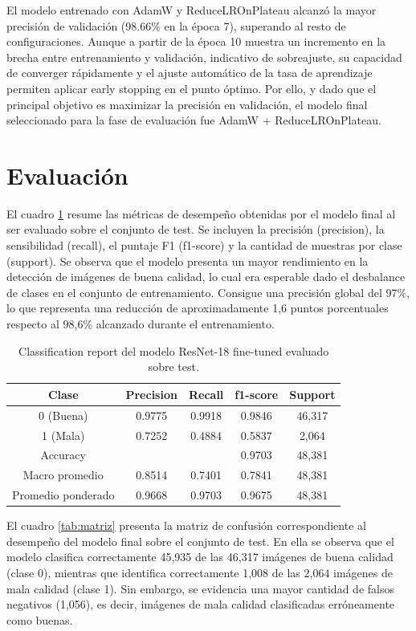 El modelo entrenado con AdamW y ReduceLROnPlateau alcanzó la mayor precisión de validación (98.66\% en la época 7), superando al resto de configuraciones. Aunque a partir de la época 10 muestra un incremento en la brecha entre entrenamiento y validación, indicativo de sobreajuste, su capacidad de converger rápidamente y el ajuste automático de la tasa de aprendizaje permiten aplicar early stopping en el punto óptimo. Por ello, y dado que el principal objetivo es maximizar la precisión en validación, el modelo final seleccionado para la fase de evaluación fue AdamW + ReduceLROnPlateau.

\section{Evaluación}
El cuadro \ref{tab:evaluacion} resume las métricas de desempeño obtenidas por el modelo final al ser evaluado sobre el conjunto de test. Se incluyen la precisión (precision), la sensibilidad (recall), el puntaje F1 (f1-score) y la cantidad de muestras por clase (support). Se observa que el modelo presenta un mayor rendimiento en la detección de imágenes de buena calidad, lo cual era esperable dado el desbalance de clases en el conjunto de entrenamiento. Consigue una precisión global del 97\%, lo que representa una reducción de aproximadamente 1,6 puntos porcentuales respecto al 98,6\% alcanzado durante el entrenamiento.

\begin{table}[H]
	\centering
	\renewcommand{\arraystretch}{1.5}
		\begin{tabular}{ ||ccccc||  }
			\hline
			\textbf{Clase} & \textbf{Precision} & \textbf{Recall} & \textbf{f1-score} & \textbf{Support} \\
			\hline
			0 (Buena) & 0.9775 & 0.9918 & 0.9846 & 46,317 \\
			\hline
			1 (Mala) & 0.7252 & 0.4884 & 0.5837 & 2,064 \\
			\hline
			Accuracy &  &  & 0.9703 & 48,381 \\
			\hline
			Macro promedio & 0.8514 & 0.7401 & 0.7841 & 48,381 \\
			\hline
			Promedio ponderado & 0.9668 & 0.9703 & 0.9675 & 48,381 \\
			\hline
		\end{tabular}
	\caption{Classification report del modelo ResNet-18 fine-tuned evaluado sobre test.}
	\label{tab:evaluacion}
\end{table}

El cuadro \ref{tab:matriz} presenta la matriz de confusión correspondiente al desempeño del modelo final sobre el conjunto de test. En ella se observa que el modelo clasifica correctamente 45,935 de las 46,317 imágenes de buena calidad (clase 0), mientras que identifica correctamente 1,008 de las 2,064 imágenes de mala calidad (clase 1). Sin embargo, se evidencia una mayor cantidad de falsos negativos (1,056), es decir, imágenes de mala calidad clasificadas erróneamente como buenas.

